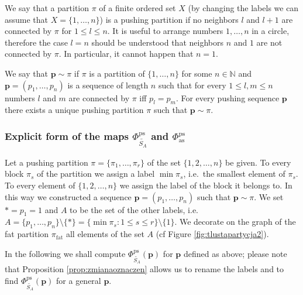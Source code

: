 \documentclass[12pt,dvips]{amsart}
\numberwithin{equation}{section} \numberwithin{figure}{section}
\theoremstyle{plain}
\theoremstyle{definition}
\newtheorem*{definition}{Definition}
\theoremstyle{remark}
\newcommand{\ppp}{{\mathbf{p}}}
\newcommand{\N}{{\mathbb{N}}}
\newcommand{\Sn}[1]{{{S}}_{#1}}
\newcommand{\xtra}{\ast}
\newcommand{\fpsas}{\Phi^{\ps}_{\adm}}
\newcommand{\fpss}{\Phi^{\ps}_{\PartPerm{A}}}
\newcommand{\PartPerm}[1]{\widetilde{\Sn{#1}}}
\DeclareMathOperator{\fat}{fat}
\DeclareMathOperator{\adm}{as}
\DeclareMathOperator{\ps}{ps}
\DeclareMathOperator{\blockweight}{block\ weight}
\DeclareMathOperator{\numberofcycles}{number\ of\ cycles}
\DeclareMathOperator{\degeneracy}{degeneracy}
\begin{document}
We say that a partition $\pi$ of a finite ordered set $X$ (by
changing the labels we can assume that $X=\{1,\dots,n\}$) is a
pushing partition if no neighbors $l$ and $l+1$ are connected by
$\pi$ for $1\leq l\leq n$. It is useful to arrange numbers
$1,\dots,n$ in a circle, therefore the case $l=n$ should be
understood that neighbors $n$ and $1$ are not connected by $\pi$. In
particular, it cannot happen that $n=1$.

We say that $\ppp\sim\pi$ if $\pi$ is a partition of $\{1,\dots,n\}$
for some $n\in\N$ and $\ppp=(p_1,\dots,p_n)$ is a sequence of length
$n$ such that for every $1\leq l,m\leq n$ numbers $l$ and $m$ are
connected by $\pi$ iff $p_l=p_m$. For every pushing sequence $\ppp$
there exists a unique pushing partition $\pi$ such that
$\ppp\sim\pi$.


\subsubsection{Explicit form of the maps $\fpss$ and $\fpsas$}
\label{subsec:explicit} Let a pushing partition
$\pi=\{\pi_1,\dots,\pi_r\}$ of the set $\{1,2,\dots,n\}$ be given.
To every block $\pi_s$ of the partition we assign a label $\min
\pi_s$, i.e.~the smallest element of $\pi_s$. To every element of
$\{1,2,\dots,n\}$ we assign the label of the block it belongs to. In
this way we constructed a sequence $\ppp=(p_1,\dots,p_n)$ such that
$\ppp \sim \pi$. We set $\xtra=p_1=1$ and $A$ to be the set of the
other labels, i.e.~$A=\{p_1,\dots,p_n\}\setminus\{\xtra\}=\{\min
\pi_s: 1\leq s\leq r\}\setminus \{1\}$. We decorate on the graph of
the fat partition $\pi_{\fat}$ all elements of the set $A$ (cf
Figure \ref{fig:tlustapartycja2}).

In the following we shall compute $\fpss(\ppp)$ for $\ppp$ defined
as above; please note that Proposition \ref{prop:zmianaoznaczen}
allows us to rename the labels and to find $\fpss(\ppp)$ for a
general $\ppp$.
\end{document}
